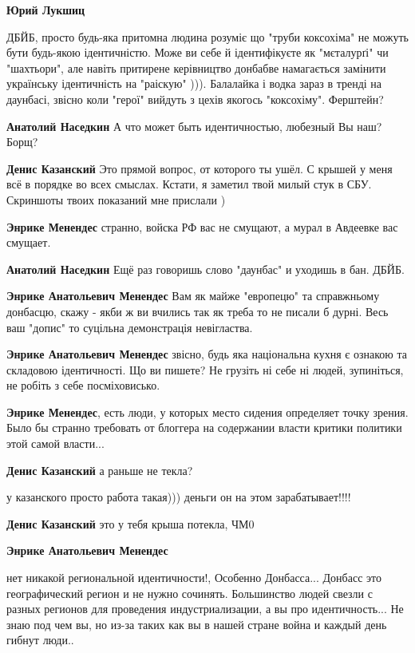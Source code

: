 \begin{itemize}
\begin{itemize}
\textbf{Юрий Лукшиц} 

ДБЙБ, просто будь-яка притомна людина розуміє що "труби коксохіма" не можуть
бути будь-якою ідентичністю. Може ви себе й ідентифікуєте як "мєталурґі" чи
"шахтьори", але навіть притирене керівництво донбабве намагається замінити
українську ідентичність на "раіскую" ))). Балалайка і водка зараз в тренді на
даунбасі, звісно коли "герої" вийдуть з цехів якогось "коксохіму". Ферштейн?

\textbf{Анатолий Наседкин} А что может быть идентичностью, любезный Вы наш? Борщ?

\textbf{Денис Казанский} Это прямой вопрос, от которого ты ушёл. С крышей у меня всё в порядке во всех смыслах.
Кстати, я заметил твой милый стук в СБУ. Скриншоты твоих показаний мне прислали )

\textbf{Энрике Менендес} странно, войска РФ вас не смущают, а мурал в Авдеевке вас смущает.

\textbf{Анатолий Наседкин} Ещё раз говоришь слово "даунбас" и уходишь в бан. ДБЙБ.

\textbf{Энрике Анатольевич Менендес} Вам як майже "европецю" та справжньому донбасцю, скажу - якби ж ви вчились так як треба то не писали б дурні. Весь ваш "допис" то суцільна демонстрація невігластва.

\textbf{Энрике Анатольевич Менендес} звісно, будь яка національна кухня є ознакою та складовою ідентичності. Що ви пишете? Не грузіть ні себе ні людей, зупиніться, не робіть з себе посміховисько.

\textbf{Энрике Менендес}, есть люди, у которых место сидения определяет точку зрения. Было бы странно требовать от блоггера на содержании власти критики политики этой самой власти...

\textbf{Денис Казанский} а раньше не текла?

у казанского просто работа такая))) деньги он на этом зарабатывает!!!!

\textbf{Денис Казанский} это у тебя крыша потекла, ЧМ0

\textbf{Энрике Анатольевич Менендес} 

нет никакой региональной идентичности!, Особенно Донбасса... Донбасс это
географический регион и не нужно сочинять. Большинство людей свезли с разных
регионов для проведения индустриализации, а вы про идентичность... Не знаю под
чем вы, но из-за таких как вы в нашей стране война и каждый день гибнут люди..


\end{itemize}
\end{itemize}
